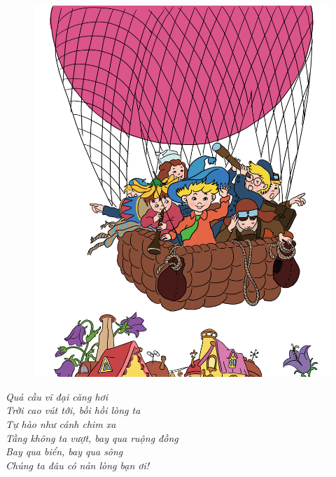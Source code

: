 \begin{multicols}{2}
	\begin{figure}[H]
		\centering
		\vspace*{-5pt}
		\captionsetup{labelformat= empty, justification=centering}
		\includegraphics[width=0.9\linewidth]{Hinh0}
		\vspace*{-10pt}
	\end{figure}
	\begin{flushleft}
		\textit{Quả cầu vĩ đại căng hơi\\
		Trời cao vút tới, bồi hồi lòng ta\\
		Tự hào như cánh chim xa\\
		Tầng không ta vượt, bay qua ruộng đồng\\
		Bay qua biển, bay qua sông\\
		Chúng ta đâu có nản lòng bạn ơi!}
	\end{flushleft}
\end{multicols}